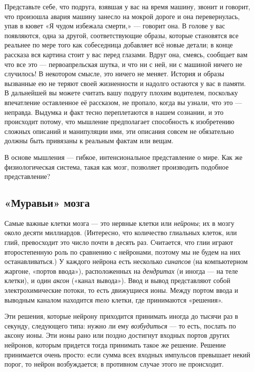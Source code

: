 \documentclass[../main.tex]{subfiles}
\begin{document}
Представьте себе, что подруга, взявшая у вас на время машину, звонит и говорит, что произошла авария машину занесло на мокрой дороге и она перевернулась, упав в кювет «Я чудом избежала смерти,» --- говорит она. В голове у вас появляются, одна за другой, соответствующие образы, которые становятся все реальнее по мере того как собеседница добавляет всё новые детали; в конце рассказа вся картина стоит у вас перед глазами. Вдруг она, смеясь, сообщает вам что все это --- первоапрельская шутка, и что ни с ней, ни с машиной ничего не случилось! В некотором смысле, это ничего не меняет. История и образы вызванные ею не теряют своей жизненности и надолго остаются у вас в памяти. В дальнейшей вы можете считать вашу подругу плохим водителем, поскольку впечатление оставленное её рассказом, не пропало, когда вы узнали, что это --- неправда. Выдумка и факт тесно переплетаются в нашем сознании, и это происходит потому, что мышление предполагает способность к изобретению сложных описаний и манипуляции ими, эти описания совсем не обязательно должны быть привязаны к реальным фактам или вещам.

В основе мышления --- гибкое, интенсиональное представление о мире. Как же физиологическая система, такая как мозг, позволяет производить подобное представление?


\subsection{«Муравьи» мозга}

Самые важные клетки мозга --- это нервные клетки или \emph{нейроны}; их в мозгу около десяти миллиардов. (Интересно, что количество глиальных клеток, или глий, превосходит это число почти в десять раз. Считается, что глии играют второстепенную роль по сравнению с нейронами, поэтому мы не будем на них останавливаться.) У каждого нейрона есть несколько \emph{синапсов} (на компьютерном жаргоне, «портов ввода»), расположенных на \emph{дендритах} (и иногда --- на теле клетки), и один \emph{аксон} («канал вывода»). Ввод и вывод представляют собой электрохимические потоки, то есть движущиеся ионы. Между портом ввода и выводным каналом находится \emph{тело} клетки, где принимаются «решения».

Эти решения, которые нейрону приходится принимать иногда до тысячи раз в секунду, следующего типа: нужно ли ему \emph{возбудиться} --- то есть, послать по аксону ионы. Эти ионы рано или поздно достигнут входных портов других нейронов, которым придется тогда принимать такое же решение. Решение принимается очень просто: если сумма всех входных импульсов превышает некий порог, то нейрон возбуждается; в противном случае этого не происходит.
\end{document}
